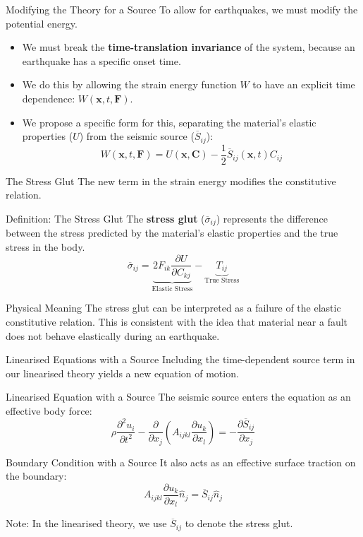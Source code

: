 \documentclass{beamer}
\begin{document}
\begin{frame}{Modifying the Theory for a Source}
    To allow for earthquakes, we must modify the potential energy.
    \begin{itemize}
        \item We must break the \textbf{time-translation invariance} of the system, because an earthquake has a specific onset time.
        \pause
        \item We do this by allowing the strain energy function $W$ to have an explicit time dependence: $W(\mathbf{x}, t, \mathbf{F})$.
        \pause
        \item We propose a specific form for this, separating the material's elastic properties ($U$) from the seismic source ($\overline{S}_{ij}$):
        $$ W(\mathbf{x}, t, \mathbf{F}) = U(\mathbf{x}, \mathbf{C}) - \frac{1}{2}\overline{S}_{ij}(\mathbf{x}, t)C_{ij} $$
    \end{itemize}
\end{frame}

\begin{frame}{The Stress Glut}
    The new term in the strain energy modifies the constitutive relation.
    \pause
    \begin{block}{Definition: The Stress Glut}
        The \textbf{stress glut} ($\overline{\sigma}_{ij}$) represents the difference between the stress predicted by the material's elastic properties and the true stress in the body.
        $$ \overline{\sigma}_{ij} = \underbrace{2F_{ik}\frac{\partial U}{\partial C_{kj}}}_{\text{Elastic Stress}} - \underbrace{T_{ij}}_{\text{True Stress}} $$
    \end{block}
    \pause
    \begin{exampleblock}{Physical Meaning}
        The stress glut can be interpreted as a failure of the elastic constitutive relation. This is consistent with the idea that material near a fault does not behave elastically during an earthquake.
    \end{exampleblock}
\end{frame}

\begin{frame}{Linearised Equations with a Source}
    Including the time-dependent source term in our linearised theory yields a new equation of motion.
    \begin{alertblock}{Linearised Equation with a Source}
        The seismic source enters the equation as an effective body force:
        $$ \rho\frac{\partial^2 u_{i}}{\partial t^2} - \frac{\partial}{\partial x_{j}}\left(A_{ijkl}\frac{\partial u_{k}}{\partial x_{l}}\right) = -\frac{\partial\overline{S}_{ij}}{\partial x_{j}} $$
    \end{alertblock}
    \pause
    \begin{block}{Boundary Condition with a Source}
        It also acts as an effective surface traction on the boundary:
        $$ A_{ijkl}\frac{\partial u_{k}}{\partial x_{l}}\hat{n}_{j} = \overline{S}_{ij}\hat{n}_{j} $$
    \end{block}
    \small
    Note: In the linearised theory, we use $\overline{S}_{ij}$ to denote the stress glut.
\end{frame}
\end{document}
